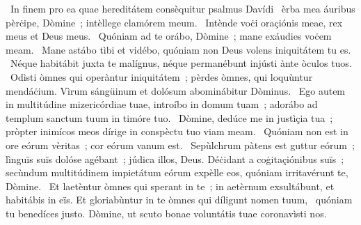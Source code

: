 {~In finem pro ea quae hereditátem consèquitur psalmus Davídi}
{%
~èrba mea áuribus pèrċipe, Dòmine~; intèllege clamórem meum.
~Intènde voċi oraçiónis meae, rex meus et Deus meus.
~Quóniam ad te orábo, Dòmine~; mane exáudies voċem meam.
~Mane astábo tìbi et vidébo, quóniam non Deus volens iniquitátem tu es.
~Néque habitábit juxta te malígnus, néque permanébunt injústi ànte òculos tuos.
~Odìsti òmnes qui operàntur iniquitátem~; pèrdes òmnes, qui loquùntur mendáċium. Vìrum sángüinum et dolósum abominábitur Dòminus.
~Ego autem in multitúdine mizericórdiae tuae, introíbo in domum tuam~; adorábo ad templum sanctum tuum in timóre tuo.
~Dòmine, dedúce me in justìçia tua~; pròpter inimícos meos dírige in conspèctu tuo viam meam.
~Quóniam non est in ore eórum vèritas~; cor eórum vanum est.
~Sepùlchrum pàtens est guttur eórum~; lìnguïs suïs dolóse agébant~; júdica illos, Deus. Déċidant a coġitaçiónibus suïs~; secùndum multitúdinem impietátum eórum expèlle eos, quóniam irritavérunt te, Dòmine.
~Et laetèntur òmnes qui sperant in te~; in aetèrnum exsultábunt, et habitábis in eïs. Et gloriabùntur in te òmnes qui díligunt nomen tuum,
~quóniam tu benedíces justo. Dòmine, ut scuto bonae voluntátis tuae coronavìsti nos.}
